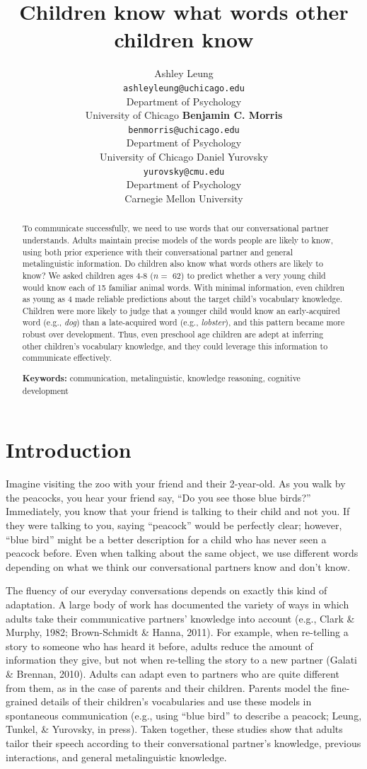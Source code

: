 \documentclass[10pt, letterpaper]{article}
\title{Children know what words other children know}
\author{Ashley Leung \\
     \texttt{ashleyleung@uchicago.edu} \\
    Department of Psychology \\ University of Chicago
\And \textbf{Benjamin C. Morris} \\
     \texttt{benmorris@uchicago.edu} \\
    Department of Psychology \\ University of Chicago
\And Daniel Yurovsky \\
     \texttt{yurovsky@cmu.edu} \\
    Department of Psychology \\ Carnegie Mellon University}
\begin{document}
\maketitle

\begin{abstract}
To communicate successfully, we need to use words that our
conversational partner understands. Adults maintain precise models of
the words people are likely to know, using both prior experience with
their conversational partner and general metalinguistic information. Do
children also know what words others are likely to know? We asked
children ages 4-8 (\(n =\) 62) to predict whether a very young child
would know each of 15 familiar animal words. With minimal information,
even children as young as 4 made reliable predictions about the target
child's vocabulary knowledge. Children were more likely to judge that a
younger child would know an early-acquired word (e.g., \emph{dog}) than
a late-acquired word (e.g., \emph{lobster}), and this pattern became
more robust over development. Thus, even preschool age children are
adept at inferring other children's vocabulary knowledge, and they could
leverage this information to communicate effectively.

\textbf{Keywords:}
communication, metalinguistic, knowledge reasoning, cognitive
development
\end{abstract}

\hypertarget{introduction}{%
\section{Introduction}\label{introduction}}

Imagine visiting the zoo with your friend and their 2-year-old. As you
walk by the peacocks, you hear your friend say, ``Do you see those blue
birds?'' Immediately, you know that your friend is talking to their
child and not you. If they were talking to you, saying ``peacock'' would
be perfectly clear; however, ``blue bird'' might be a better description
for a child who has never seen a peacock before. Even when talking about
the same object, we use different words depending on what we think our
conversational partners know and don't know.

The fluency of our everyday conversations depends on exactly this kind
of adaptation. A large body of work has documented the variety of ways
in which adults take their communicative partners' knowledge into
account (e.g., Clark \& Murphy, 1982; Brown-Schmidt \& Hanna, 2011). For
example, when re-telling a story to someone who has heard it before,
adults reduce the amount of information they give, but not when
re-telling the story to a new partner (Galati \& Brennan, 2010). Adults
can adapt even to partners who are quite different from them, as in the
case of parents and their children. Parents model the fine-grained
details of their children's vocabularies and use these models in
spontaneous communication (e.g., using ``blue bird'' to describe a
peacock; Leung, Tunkel, \& Yurovsky, in press). Taken together, these
studies show that adults tailor their speech according to their
conversational partner's knowledge, previous interactions, and general
metalinguistic knowledge.
\end{document}
